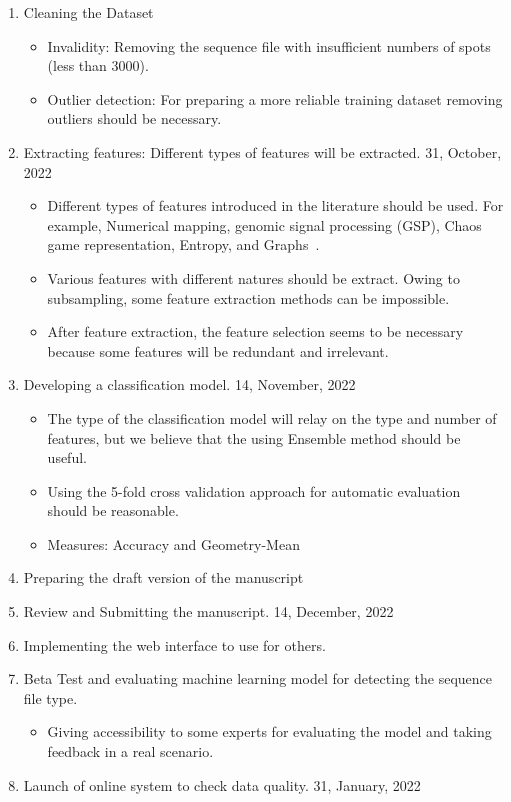 \documentclass[a4paper]{article}
\newcommand{\deadline}[1]{{\color{blue} \hfill{#1} }}
\begin{document}
\begin{enumerate}
        \item Cleaning the Dataset
        \begin{itemize}
            \item Invalidity: Removing the sequence file with insufficient numbers of spots (less than 3000).
            \item Outlier detection: For preparing a more reliable training dataset removing outliers should be necessary.
        \end{itemize}
        \item Extracting features: Different types of features will be extracted. \deadline{31, October, 2022}
        \begin{itemize}
            \item Different types of features introduced in the literature should be used.
            For example, Numerical mapping, genomic signal processing (GSP), Chaos game representation, Entropy, and Graphs~\cite{RF101}.
            \item Various features with different natures should be extract.
            Owing to subsampling, some feature extraction methods can be impossible.
            \item After feature extraction, the feature selection seems to be necessary because some features will be redundant and irrelevant.
        \end{itemize}
        \item Developing a classification model.  \deadline{14, November, 2022}
        \begin{itemize}
            \item The type of the classification model will relay on the type and number of features, but we believe that the using Ensemble method should be useful.
            \item Using the 5-fold cross validation approach for automatic evaluation should be reasonable.
            \item Measures: Accuracy and Geometry-Mean
        \end{itemize}
        \item Preparing the draft version of the manuscript
        \item Review and Submitting the manuscript.\deadline{14, December, 2022}
        \item Implementing the web interface to use for others.
        \item Beta Test and evaluating machine learning model for detecting the sequence file type.
        \begin{itemize}
            \item Giving accessibility to some experts for evaluating the model and taking feedback in a real scenario.
        \end{itemize}
        \item Launch of online system to check data quality. \deadline{31, January, 2022}

    \end{enumerate}
\end{document}
